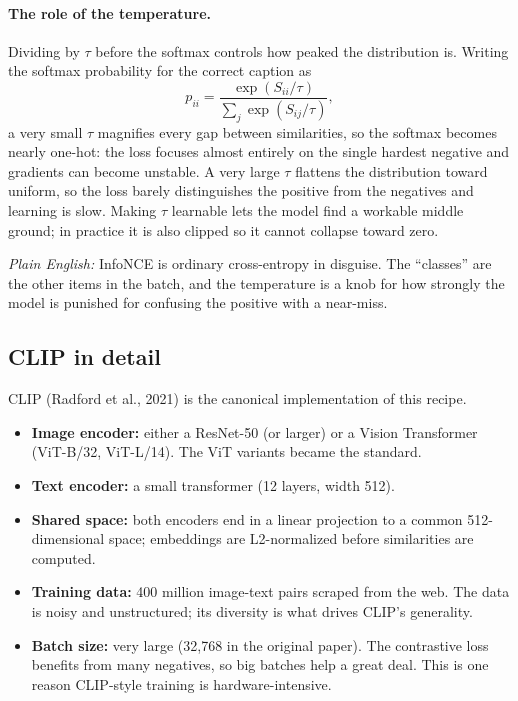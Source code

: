 \documentclass[11pt]{article}
\theoremstyle{remark}
\newcommand{\plain}[1]{\medskip\noindent\textit{Plain English:} #1\medskip}
\begin{document}
\paragraph{The role of the temperature.}
Dividing by $\tau$ before the softmax controls how peaked the distribution is. Writing the softmax probability for the correct caption as
\[
p_{ii} = \frac{\exp(S_{ii}/\tau)}{\sum_j \exp(S_{ij}/\tau)},
\]
a very small $\tau$ magnifies every gap between similarities, so the softmax becomes nearly one-hot: the loss focuses almost entirely on the single hardest negative and gradients can become unstable. A very large $\tau$ flattens the distribution toward uniform, so the loss barely distinguishes the positive from the negatives and learning is slow. Making $\tau$ learnable lets the model find a workable middle ground; in practice it is also clipped so it cannot collapse toward zero.

\plain{InfoNCE is ordinary cross-entropy in disguise. The ``classes'' are the other items in the batch, and the temperature is a knob for how strongly the model is punished for confusing the positive with a near-miss.}

\subsection{CLIP in detail}
CLIP (Radford et al., 2021) is the canonical implementation of this recipe.
\begin{itemize}[leftmargin=1.4em]
  \item \textbf{Image encoder:} either a ResNet-50 (or larger) or a Vision Transformer (ViT-B/32, ViT-L/14). The ViT variants became the standard.
  \item \textbf{Text encoder:} a small transformer (12 layers, width 512).
  \item \textbf{Shared space:} both encoders end in a linear projection to a common 512-dimensional space; embeddings are L2-normalized before similarities are computed.
  \item \textbf{Training data:} 400 million image-text pairs scraped from the web. The data is noisy and unstructured; its diversity is what drives CLIP's generality.
  \item \textbf{Batch size:} very large (32,768 in the original paper). The contrastive loss benefits from many negatives, so big batches help a great deal. This is one reason CLIP-style training is hardware-intensive.
\end{itemize}
\end{document}
